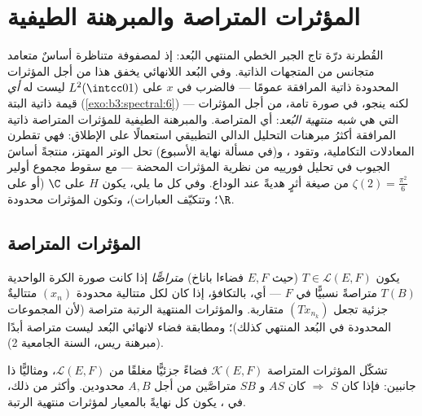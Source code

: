 \chapter{المؤثرات المتراصة والمبرهنة الطيفية}
\label{ch:b3:spectral}

القُطرنة درّة تاج الجبر الخطي المنتهي البُعد: إذ لمصفوفة
متناظرة أساسٌ متعامد متجانس من المتجهات الذاتية. وفي البُعد
اللانهائي يخفق هذا من أجل المؤثرات المحدودة ذاتية المرافقة
عمومًا --- فالضرب في $x$ على $L^2(\intcc01)$ ليست له \emph{أي}
قيمة ذاتية البتة (\cref{exo:b3:spectral:6}) --- لكنه ينجو، في صورة تامة، من
أجل المؤثرات التي هي \emph{شبه منتهية البُعد}: أي المتراصة.
والمبرهنة الطيفية للمؤثرات المتراصة ذاتية المرافقة أكثرُ
مبرهنات التحليل الدالي التطبيقي استعمالًا على الإطلاق: فهي
تقطرن المعادلات التكاملية، وتقود ، و(في مسألة
نهاية الأسبوع) تحل الوتر المهتز، منتجةً أساسَ الجيوب في تحليل
فورييه من نظرية المؤثرات المحضة --- مع سقوط مجموع أولير $\zeta(2) = \frac{\pi^2}6$
من صيغة أثرٍ هديةً عند الوداع. وفي كل ما يلي، يكون $H$  على $\C$ (أو على $\R$؛ وتتكيّف العبارات)، وتكون
المؤثرات محدودة.

\section{المؤثرات المتراصة}

\begin{definition}\label{def:b3:spectral:compact}
يكون $T \in \mathcal L(E, F)$ (حيث $E, F$ فضاءا باناخ) \emph{متراصًّا} إذا كانت صورة الكرة الواحدية $T(B)$ متراصةً نسبيًّا في
$F$ --- أي، بالتكافؤ، إذا كان لكل متتالية محدودة $(x_n)$
متتاليةٌ جزئية تجعل $(Tx_{n_k})$ متقاربة. والمؤثرات المنتهية
الرتبة متراصة (لأن المجموعات المحدودة في البُعد المنتهي كذلك)؛
ومطابقة فضاء لانهائي البُعد ليست متراصة أبدًا (مبرهنة ريس،
السنة الجامعية 2).
\end{definition}

\begin{proposition}\label{prop:b3:spectral:ideal}
تشكّل المؤثرات المتراصة $\mathcal K(E, F)$ فضاءً جزئيًّا مغلقًا من $\mathcal L(E, F)$،
ومثاليًّا ذا جانبين: فإذا كان $S$  $\Rightarrow$ كان
$AS$ و $SB$ متراصَّين من أجل $A, B$ محدودين. وأكثر من ذلك، في
، يكون كل  نهايةً بالمعيار لمؤثرات منتهية
الرتبة.
\end{proposition}


